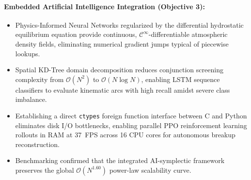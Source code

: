 \paragraph{Embedded Artificial Intelligence Integration (Objective 3):}
\begin{itemize}
    \item Physics-Informed Neural Networks regularized by the differential hydrostatic equilibrium equation provide continuous, $\mathcal{C}^\infty$-differentiable atmospheric density fields, eliminating numerical gradient jumps typical of piecewise lookups.
    \item Spatial KD-Tree domain decomposition reduces conjunction screening complexity from $\mathcal{O}(N^2)$ to $\mathcal{O}(N \log N)$, enabling LSTM sequence classifiers to evaluate kinematic arcs with high recall amidst severe class imbalance.
    \item Establishing a direct \texttt{ctypes} foreign function interface between C and Python eliminates disk I/O bottlenecks, enabling parallel PPO reinforcement learning rollouts in RAM at 37~FPS across 16 CPU cores for autonomous breakup reconstruction.
    \item Benchmarking confirmed that the integrated AI-symplectic framework preserves the global $\mathcal{O}(N^{1.60})$ power-law scalability curve.
\end{itemize}

